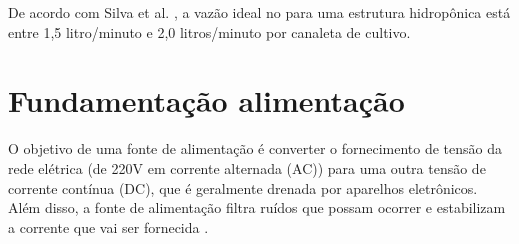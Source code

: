 De acordo com Silva et al. \cite{SILVA}, a vazão ideal no para uma estrutura hidropônica está entre 1,5 litro/minuto e 2,0 litros/minuto por canaleta de cultivo.

\section{Fundamentação alimentação}

O objetivo de uma fonte de alimentação é converter o fornecimento de tensão da rede elétrica (de 220V em corrente alternada (AC)) para uma outra tensão de corrente contínua (DC), que é geralmente drenada por aparelhos eletrônicos. Além disso, a fonte de alimentação filtra ruídos que possam ocorrer e estabilizam a corrente que vai ser fornecida \cite{SILVA}. 